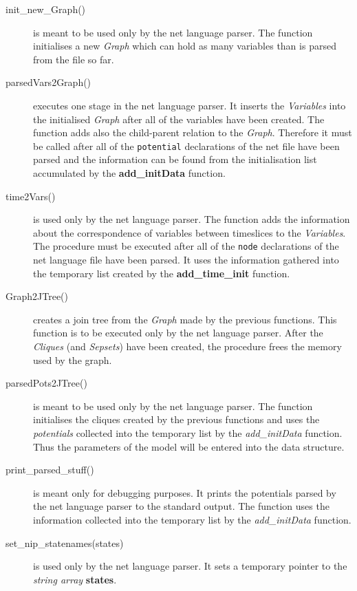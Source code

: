 \documentclass[12pt,a4paper]{report}
\begin{document}
\begin{description}
\item[init\_new\_Graph()] is meant to be used only by the net language
parser. The function initialises a new {\it Graph} which can hold as
many variables than is parsed from the file so far.

\item[parsedVars2Graph()] executes one stage in the net language
parser. It inserts the {\it Variables} into the initialised {\it
Graph} after all of the variables have been created. The function adds
also the child-parent relation to the {\it Graph}. Therefore it
must be called after all of the \verb+potential+ declarations of the
net file have been parsed and the information can be found from the
initialisation list accumulated by the \textbf{add\_initData}
function.

\item[time2Vars()] is used only by the net language parser. The
function adds the information about the correspondence of variables
between timeslices to the {\it Variables}. The procedure must be
executed after all of the \verb+node+ declarations of the net language
file have been parsed. It uses the information gathered into the
temporary list created by the \textbf{add\_time\_init} function.

\item[Graph2JTree()] creates a join tree from the {\it Graph} made by
the previous functions. This function is to be executed only by the
net language parser. After the {\it Cliques} (and {\it Sepsets}) have 
been created, the procedure frees the memory used by the graph.

\item[parsedPots2JTree()] is meant to be used only by the net language
parser. The function initialises the cliques created by the previous
functions and uses the {\it potentials} collected into the temporary
list by the {\it add\_initData} function. Thus the parameters of the
model will be entered into the data structure.

\item[print\_parsed\_stuff()] is meant only for debugging purposes. It
prints the potentials parsed by the net language parser to the
standard output. The function uses the information collected into the 
temporary list by the {\it add\_initData} function.

\item[set\_nip\_statenames(states)] is used only by the net language
parser. It sets a temporary pointer to the {\it string array}
\textbf{states}. 


\end{description}
\end{document}
